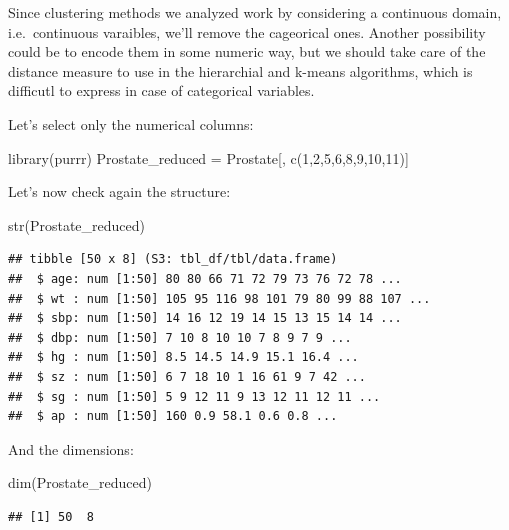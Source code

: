 \documentclass[
]{article}
\newenvironment{Shaded}{\begin{snugshade}}{\end{snugshade}}
\newcommand{\DecValTok}[1]{\textcolor[rgb]{0.00,0.00,0.81}{#1}}
\newcommand{\FunctionTok}[1]{\textcolor[rgb]{0.00,0.00,0.00}{#1}}
\newcommand{\NormalTok}[1]{#1}
\newcommand{\OtherTok}[1]{\textcolor[rgb]{0.56,0.35,0.01}{#1}}
\begin{document}
Since clustering methods we analyzed work by considering a continuous
domain, i.e.~continuous varaibles, we'll remove the cageorical ones.
Another possibility could be to encode them in some numeric way, but we
should take care of the distance measure to use in the hierarchial and
k-means algorithms, which is difficutl to express in case of categorical
variables.

Let's select only the numerical columns:

\begin{Shaded}
\begin{Highlighting}[]
\FunctionTok{library}\NormalTok{(purrr)}
\NormalTok{Prostate\_reduced }\OtherTok{=}\NormalTok{ Prostate[, }\FunctionTok{c}\NormalTok{(}\DecValTok{1}\NormalTok{,}\DecValTok{2}\NormalTok{,}\DecValTok{5}\NormalTok{,}\DecValTok{6}\NormalTok{,}\DecValTok{8}\NormalTok{,}\DecValTok{9}\NormalTok{,}\DecValTok{10}\NormalTok{,}\DecValTok{11}\NormalTok{)]}
\end{Highlighting}
\end{Shaded}

Let's now check again the structure:

\begin{Shaded}
\begin{Highlighting}[]
\FunctionTok{str}\NormalTok{(Prostate\_reduced)}
\end{Highlighting}
\end{Shaded}

\begin{verbatim}
## tibble [50 x 8] (S3: tbl_df/tbl/data.frame)
##  $ age: num [1:50] 80 80 66 71 72 79 73 76 72 78 ...
##  $ wt : num [1:50] 105 95 116 98 101 79 80 99 88 107 ...
##  $ sbp: num [1:50] 14 16 12 19 14 15 13 15 14 14 ...
##  $ dbp: num [1:50] 7 10 8 10 10 7 8 9 7 9 ...
##  $ hg : num [1:50] 8.5 14.5 14.9 15.1 16.4 ...
##  $ sz : num [1:50] 6 7 18 10 1 16 61 9 7 42 ...
##  $ sg : num [1:50] 5 9 12 11 9 13 12 11 12 11 ...
##  $ ap : num [1:50] 160 0.9 58.1 0.6 0.8 ...
\end{verbatim}

And the dimensions:

\begin{Shaded}
\begin{Highlighting}[]
\FunctionTok{dim}\NormalTok{(Prostate\_reduced)}
\end{Highlighting}
\end{Shaded}

\begin{verbatim}
## [1] 50  8
\end{verbatim}
\end{document}
